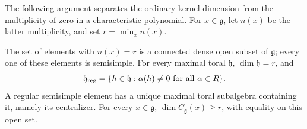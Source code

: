 The following argument separates the ordinary kernel dimension
from the multiplicity of zero in a characteristic polynomial.
For \(x\in\mathfrak g\), let \(n(x)\) be the latter multiplicity,
and set \(r=\min_x n(x)\).

\begin{theorem}\label{res:D06}
The set of elements with \(n(x)=r\) is a connected dense open
subset of \(\mathfrak g\); every one of these elements is semisimple.
For every maximal toral \(\mathfrak h\),
\(\dim\mathfrak h=r\), and
\[
 \mathfrak h_{\rm reg}
 =\{h\in\mathfrak h:\alpha(h)\ne0\text{ for all }\alpha\in R\}.
\]
A regular semisimple element has a unique maximal toral
subalgebra containing it, namely its centralizer.
For every \(x\in\mathfrak g\),
\(\dim C_{\mathfrak g}(x)\ge r\), with equality on this open set.
\end{theorem}
